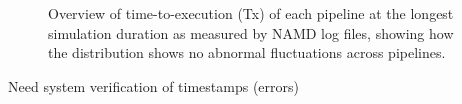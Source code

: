 \begin{figure}[!htbp]
  \centering
  \begin{minipage}[b]{0.55\textwidth}
  \centering
  \end{minipage}
  \begin{minipage}[b]{0.44\textwidth}
  \centering
  \end{minipage}
  \caption{Overview of time-to-execution (Tx) of each pipeline at the
           longest simulation duration as measured by NAMD log files, showing
           how the distribution shows no abnormal fluctuations across
           pipelines.}\label{fig:namd_logs}
\end{figure}








Need system verification of timestamps (errors) 





